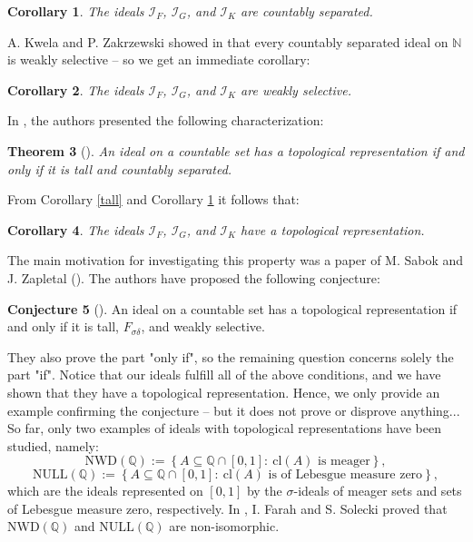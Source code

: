 \documentclass{amsart}
\newtheorem{thm}{Theorem}[section]
\newtheorem{cor}[thm]{Corollary}
\theoremstyle{definition}
\newtheorem{conj}[thm]{Conjecture}
\newcommand{\N}{{\mathbb N}}
\newcommand{\Q}{{\mathbb Q}}
\newcommand{\I}{\mathcal I}
\newcommand{\NULL}{\mathrm{NULL}}
\newcommand{\NWD}{\mathrm{NWD}}
\newcommand{\cl}{\mathrm{cl}}
\begin{document}
\begin{cor} \label{cs}
The ideals $\I_F$, $\I_G$, and $\I_K$ are countably separated.
\end{cor}

A. Kwela and P. Zakrzewski showed in \cite[Proposition 4.3]{KwelaZak} that every countably separated ideal on $\N$ is weakly selective -- so we get an immediate corollary:

\begin{cor}
The ideals $\I_F$, $\I_G$, and $\I_K$ are weakly selective.
\end{cor}


In \cite{Adas}, the authors presented the following characterization: 

\begin{thm}[{\cite[Theorem 1.1]{Adas}}]
An ideal on a countable set has a topological representation if and only if it is tall and countably separated.
\end{thm}

From Corollary \ref{tall} and Corollary \ref{cs} it follows that:

\begin{cor}
The ideals $\I_F$, $\I_G$, and $\I_K$ have a topological representation.
\end{cor}

The main motivation for investigating this property was a paper of M. Sabok and J. Zapletal (\cite{Sabok}). The authors have proposed the following conjecture:

\begin{conj}[\cite{Sabok}]
An ideal on a countable set has a topological representation if and only if it is tall, $F_{\sigma\delta}$, and weakly selective. 
\end{conj}

They also prove the part "only if", so the remaining question concerns solely the part "if".
Notice that our ideals fulfill all of the above conditions, and we have shown that they have a topological representation. Hence, we only provide an example confirming the conjecture -- but it does not prove or disprove anything...\\


So far, only two examples of ideals with topological representations have been studied, namely:
$$\NWD(\Q):=\left\{A\subseteq\mathbb{Q}\cap [0,1] :\ \cl(A) \textrm{ is meager}\right\},$$
$$\NULL(\Q):=\left\{A\subseteq\mathbb{Q}\cap [0,1] :\ \cl(A) \textrm{ is of Lebesgue measure zero}\right\},$$
which are the ideals represented on $[0,1]$ by the $\sigma$-ideals of meager sets and sets of Lebesgue measure zero, respectively. In \cite{FS}, I. Farah and S. Solecki proved that $\NWD(\Q)$ and $\NULL(\Q)$ are non-isomorphic.
\end{document}
